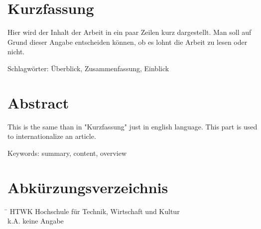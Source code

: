 \documentclass[12pt,a4paper]{scrartcl}
\begin{document}
	
	\clearpage
	\section*{Kurzfassung}
	
	Hier wird der Inhalt der Arbeit in ein paar Zeilen kurz dargestellt. Man soll auf Grund dieser Angabe entscheiden können, ob es lohnt die Arbeit zu lesen oder nicht.
	
	\medskip
	\noindent
	Schlagwörter: Überblick, Zusammenfassung, Einblick \\
	
	
	\section*{Abstract}
	
	This is the same than in "Kurzfassung" just in english language. This part is used to internationalize an article. 
	
	\medskip
	\noindent
	Keywords: summary, content, overview \\
	
	
	\clearpage
	\tableofcontents
	
	
	\clearpage
	\listoffigures
	
	
	\clearpage
	\listoftables
	
	
	
	\vfill
	\section*{Abkürzungsverzeichnis}
	
	
	\begin{tabbing}
		\hspace{2cm}\=\kill
		HTWK 	\> Hochschule für Technik, Wirtschaft und Kultur\\
		k.A. 	\> keine Angabe \\
	\end{tabbing} 
	
\end{document}
